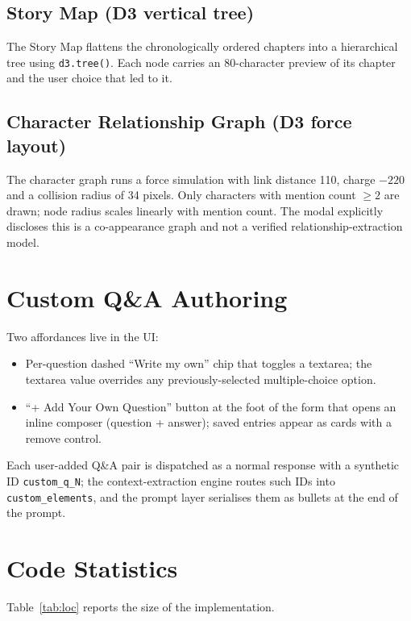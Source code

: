 \subsection{Story Map (D3 vertical tree)}
The Story Map flattens the chronologically ordered chapters into a
hierarchical tree using \texttt{d3.tree()}. Each node carries an
80-character preview of its chapter and the user choice that led
to it.

\subsection{Character Relationship Graph (D3 force layout)}
The character graph runs a force simulation with link distance 110,
charge $-220$ and a collision radius of 34 pixels. Only characters
with mention count $\geq 2$ are drawn; node radius scales linearly
with mention count. The modal explicitly discloses this is a
co-appearance graph and not a verified relationship-extraction model.

\section{Custom Q\&A Authoring}
Two affordances live in the UI:
\begin{itemize}
    \item Per-question dashed ``Write my own'' chip that toggles a
    textarea; the textarea value overrides any previously-selected
    multiple-choice option.
    \item ``+ Add Your Own Question'' button at the foot of the form
    that opens an inline composer (question + answer); saved entries
    appear as cards with a remove control.
\end{itemize}
Each user-added Q\&A pair is dispatched as a normal response with a
synthetic ID \texttt{custom\_q\_N}; the context-extraction engine
routes such IDs into \texttt{custom\_elements}, and the prompt layer
serialises them as bullets at the end of the prompt.

\section{Code Statistics}
Table~\ref{tab:loc} reports the size of the implementation.

